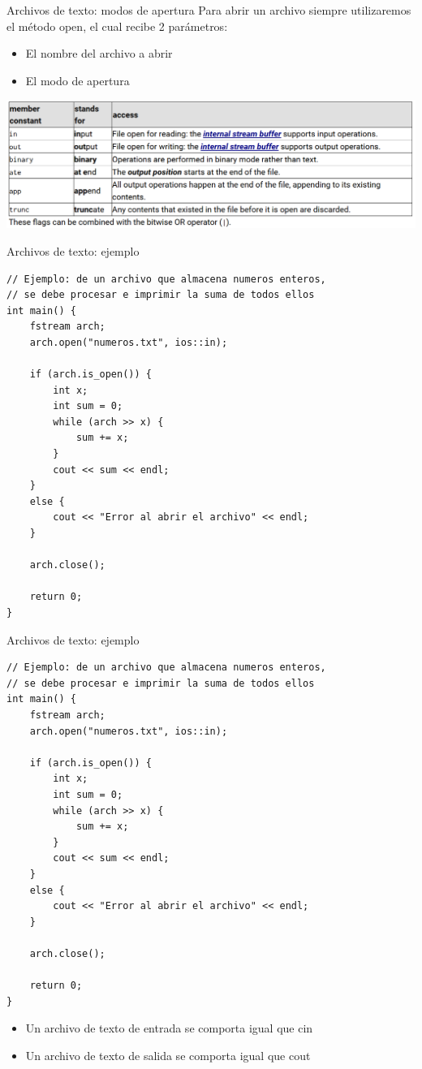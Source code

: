 \documentclass[12pt]{beamer}
\begin{document}
\begin{frame}{Archivos de texto: modos de apertura}
    Para abrir un archivo siempre utilizaremos el método \alert{open}, el cual recibe 2 parámetros:
    \begin{itemize}
        \item El nombre del archivo a abrir
        \item El modo de apertura
    \end{itemize}
    \medskip
    \includegraphics[width=\textwidth]{modos-apertura.png}
\end{frame}

\begin{frame}[fragile]{Archivos de texto: ejemplo}
    \begin{lstlisting}[basicstyle=\tiny]
// Ejemplo: de un archivo que almacena numeros enteros,
// se debe procesar e imprimir la suma de todos ellos
int main() {
    fstream arch;
    arch.open("numeros.txt", ios::in);
    
    if (arch.is_open()) {
        int x;
        int sum = 0;
        while (arch >> x) {
            sum += x;
        }
        cout << sum << endl;
    }
    else {
        cout << "Error al abrir el archivo" << endl;
    }
    
    arch.close();
    
    return 0;
}
\end{lstlisting}
\end{frame}

\begin{frame}[fragile]{Archivos de texto: ejemplo}
\begin{lstlisting}[basicstyle=\tiny]
// Ejemplo: de un archivo que almacena numeros enteros,
// se debe procesar e imprimir la suma de todos ellos
int main() {
	fstream arch;
	arch.open("numeros.txt", ios::in);
	
	if (arch.is_open()) {
		int x;
		int sum = 0;
		while (arch >> x) {
			sum += x;
		}
		cout << sum << endl;
	}
	else {
		cout << "Error al abrir el archivo" << endl;
	}
	
	arch.close();
	
	return 0;
}
\end{lstlisting}
\begin{itemize}
    \item Un archivo de texto de entrada se comporta igual que \alert{cin}
    \item Un archivo de texto de salida se comporta igual que \alert{cout}
\end{itemize}
\end{frame}
\end{document}
